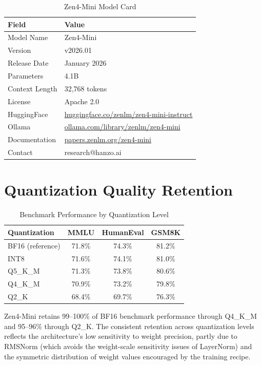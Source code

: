 \documentclass[11pt,a4paper]{article}
\begin{document}
\begin{table}[H]
\centering
\begin{tabular}{ll}
\toprule
\textbf{Field} & \textbf{Value} \\
\midrule
Model Name      & Zen4-Mini \\
Version         & v2026.01 \\
Release Date    & January 2026 \\
Parameters      & 4.1B \\
Context Length  & 32,768 tokens \\
License         & Apache 2.0 \\
HuggingFace     & \href{https://huggingface.co/zenlm/zen4-mini-instruct}{huggingface.co/zenlm/zen4-mini-instruct} \\
Ollama          & \href{https://ollama.com/library/zenlm/zen4-mini}{ollama.com/library/zenlm/zen4-mini} \\
Documentation   & \href{https://papers.zenlm.org/zen4-mini}{papers.zenlm.org/zen4-mini} \\
Contact         & research@hanzo.ai \\
\bottomrule
\end{tabular}
\caption{Zen4-Mini Model Card}
\end{table}

\section{Quantization Quality Retention}

\begin{table}[H]
\centering
\begin{tabular}{lccc}
\toprule
\textbf{Quantization} & \textbf{MMLU} & \textbf{HumanEval} & \textbf{GSM8K} \\
\midrule
BF16 (reference)  & 71.8\% & 74.3\% & 81.2\% \\
INT8              & 71.6\% & 74.1\% & 81.0\% \\
Q5\_K\_M          & 71.3\% & 73.8\% & 80.6\% \\
Q4\_K\_M          & 70.9\% & 73.2\% & 79.8\% \\
Q2\_K             & 68.4\% & 69.7\% & 76.3\% \\
\bottomrule
\end{tabular}
\caption{Benchmark Performance by Quantization Level}
\end{table}

Zen4-Mini retains 99--100\% of BF16 benchmark performance through Q4\_K\_M and 95--96\%
through Q2\_K. The consistent retention across quantization levels reflects the
architecture's low sensitivity to weight precision, partly due to RMSNorm (which avoids
the weight-scale sensitivity issues of LayerNorm) and the symmetric distribution of
weight values encouraged by the training recipe.
\end{document}
